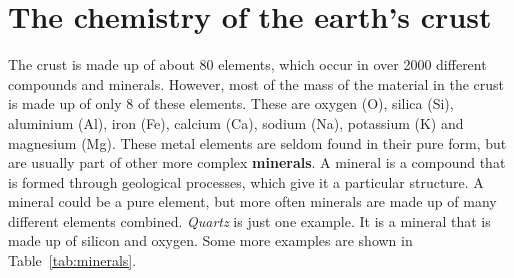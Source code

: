 
% 






\section{The chemistry of the earth's crust}

The crust is made up of about 80 elements, which occur in over 2000 different compounds and minerals. However, most of the mass of the material in the crust is made up of only 8 of these elements. These are oxygen (O), silica (Si), aluminium (Al), iron (Fe), calcium (Ca), sodium (Na), potassium (K) and magnesium (Mg). These metal elements are seldom found in their pure form, but are usually part of other more complex \textbf{minerals}. A mineral is a compound that is formed through geological processes, which give it a particular structure. A mineral could be a pure element, but more often minerals are made up of many different elements combined. \textit{Quartz} is just one example. It is a mineral that is made up of silicon and oxygen. Some more examples are shown in Table~\ref{tab:minerals}.

